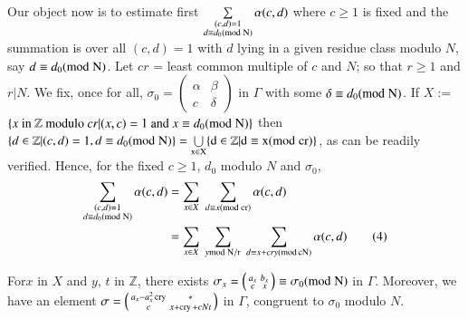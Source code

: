 Our object now is to estimate first
$\sum\limits_{\substack{(c,d)=1\\ d\equiv d_{0}(\rm{mod} \; N)}}\alpha(c,d)$
where $c\geq 1$ is fixed and the summation is over all $(c,d)=1$ with
$d$ lying in a given residue class modulo $N$, say $d\equiv d_{0}(\rm{mod} \;
N)$. Let $cr$ = least common multiple of $c$ and $N$; so that $r\geq
1$ and $r|N$. We fix, once for all,
$\sigma_{0}=\left(\begin{smallmatrix} \alpha & \beta\\ c &\delta
\end{smallmatrix}\right)$ in $\Gamma$ with some $\delta\equiv
d_{0}(\rm{mod} \; N)$. If $X:= $ $\{x\text{ in } \mathbb{Z} \text{ modulo }
cr|(x,c)=1 \text{ and } x\equiv d_{0}(\rm{mod} \; N)\}$ then
$\{d\in\mathbb{Z}|(c,d)=1, d\equiv d_{0}(\rm{mod} \;
N)\}=\bigcup\limits_{x\in X}\{d\in\mathbb{Z}|d\equiv x(\rm{mod} \; cr)\}$, as
can be readily verified. Hence, for the fixed $c\geq 1$, $d_{0}$
modulo $N$ and $\sigma_{0}$,
\begin{align*}
\sum_{\substack{(c,d)=1\\ d\equiv d_{0}(\rm{mod} \;
    N)}}\alpha(c,d)&  =\sum_{x\in X} \; \sum_{d\equiv x(\rm{mod} \;
  cr)}\alpha(c,d)\\
& =\sum_{x\in X} \; \sum_{y\rm{mod}\; N/r} \; \sum_{d\equiv x+cry
  (\rm{mod}\, c N)}\alpha(c,d)\tag{4}\label{c1:eq4}
\end{align*}

\begin{sublemma}\label{c1:lem-1.1.6}
For\pageoriginale $x$ in $X$ and $y$, $t$ in $\mathbb{Z}$, there
exists $\sigma_{x}=\left(\begin{smallmatrix} a_{x} & b_{x}\\ c & x
\end{smallmatrix}\right)\equiv \sigma_{0}(\rm{mod} \; N)$ in
$\Gamma$. Moreover, we have an element
$\sigma=\left(\begin{smallmatrix}
a_{x}-a^{2}_{x}\operatorname{cry} & \ast\\ c & x+\operatorname{cry}+cNt
\end{smallmatrix}\right)$ in $\Gamma$, congruent to $\sigma_{0}$
modulo $N$.
\end{sublemma}

